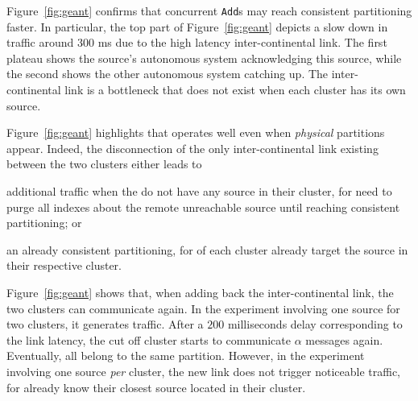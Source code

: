 \begin{asparadesc}
\noindent Figure~\ref{fig:geant} confirms that concurrent
\texttt{Add}s may reach consistent partitioning faster. In particular,
the top part of Figure~\ref{fig:geant} depicts a slow down in traffic
around $300$ ms due to the high latency inter-continental link. The
first plateau shows the source's autonomous system acknowledging this
source, while the second shows the other autonomous system catching
up.  The inter-continental link is a bottleneck that does not exist
when each cluster has its own source.

\noindent Figure~\ref{fig:geant} highlights that \NAME operates well
even when \emph{physical} partitions appear. Indeed, the disconnection
of the only inter-continental link existing between the two clusters
either leads to 
\begin{inparaenum}[(i)]
\item additional traffic when the \processes do not have any source in
  their cluster, for \processes need to purge all indexes about the
  remote unreachable source until reaching consistent partitioning; or
\item an already consistent partitioning, for \processes of each
  cluster already target the source in their respective cluster.
\end{inparaenum}

\noindent Figure~\ref{fig:geant} shows that, when adding back the
inter-continental link, the two clusters can communicate again. In the
experiment involving one source for two clusters, it generates
traffic. After a $200$ milliseconds delay corresponding to the link
latency, the cut off cluster starts to communicate $\alpha$ messages
again. Eventually, all \processes belong to the same
partition. However, in the experiment involving one source \emph{per}
cluster, the new link does not trigger noticeable traffic, for
\processes already know their closest source located in their cluster.

\end{asparadesc}

